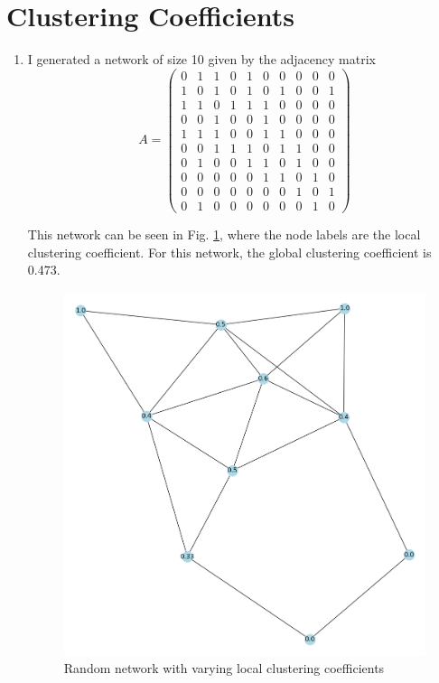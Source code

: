 \documentclass[a4paper]{article}
\begin{document}
\pagebreak

\section{Clustering Coefficients}

\begin{enumerate}[label={(4. \alph*)}]    
     \item 
         I generated a network of size 10 given by the adjacency matrix
\begin{equation*}
    A = 
    \begin{pmatrix} 
        0 & 1 & 1 & 0 & 1 & 0 & 0 & 0 & 0 & 0\\
        1 & 0 & 1 & 0 & 1 & 0 & 1 & 0 & 0 & 1\\
        1 & 1 & 0 & 1 & 1 & 1 & 0 & 0 & 0 & 0\\
        0 & 0 & 1 & 0 & 0 & 1 & 0 & 0 & 0 & 0\\
        1 & 1 & 1 & 0 & 0 & 1 & 1 & 0 & 0 & 0\\
        0 & 0 & 1 & 1 & 1 & 0 & 1 & 1 & 0 & 0\\
        0 & 1 & 0 & 0 & 1 & 1 & 0 & 1 & 0 & 0\\
        0 & 0 & 0 & 0 & 0 & 1 & 1 & 0 & 1 & 0\\
        0 & 0 & 0 & 0 & 0 & 0 & 0 & 1 & 0 & 1\\
        0 & 1 & 0 & 0 & 0 & 0 & 0 & 0 & 1 & 0
    \end{pmatrix} 
\end{equation*}
    


    This network can be seen in Fig. \ref{fig:small_clustering}, where the node labels are the local clustering coefficient. For this network, the global clustering coefficient is 0.473. 


    \begin{figure}[h]
        \centerline{\includegraphics[width=0.8\linewidth]{./small_clustering.png}}
        \caption{Random network with varying local clustering coefficients}
        \label{fig:small_clustering}
    \end{figure}

\end{enumerate}
\end{document}
